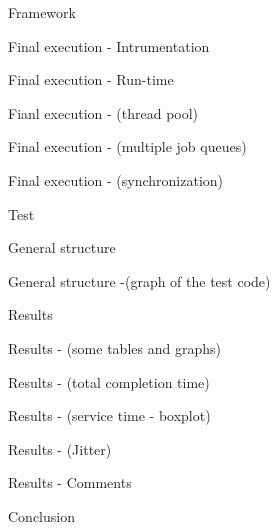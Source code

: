 \documentclass[xcolor=dvipsnames]{beamer}
\begin{document}
\begin{section}{Framework}
\begin{frame}{\hskip 0.3cm Final execution - Intrumentation}
\end{frame}

\begin{frame}{\hskip 0.3cm Final execution - Run-time}
\end{frame}

\begin{frame}{\hskip 0.3cm Fianl execution - (thread pool)}
\end{frame}

\begin{frame}{\hskip 0.3cm Final execution - (multiple job queues)}
\end{frame}

\begin{frame}{\hskip 0.3cm Final execution - (synchronization)}
\end{frame}

\end{section}
\begin{section}{Test}

\begin{frame}{\hskip 0.3cm General structure}
\end{frame}

\begin{frame}{\hskip 0.3cm General structure -(graph of the test code)}
\end{frame}

\begin{frame}{\hskip 0.3cm Results}
\end{frame}

\begin{frame}{\hskip 0.3cm Results - (some tables and graphs)}
\end{frame}

\begin{frame}{\hskip 0.3cm Results - (total completion time)}
\end{frame}

\begin{frame}{\hskip 0.3cm Results - (service time - boxplot)}
\end{frame}

\begin{frame}{\hskip 0.3cm Results - (Jitter)}
\end{frame}

\begin{frame}{\hskip 0.3cm Results - Comments}
\end{frame}

\end{section}
\begin{section}{Conclusion}

\begin{frame}{\hskip 0.3cm }
\end{frame}

\end{section}
\end{document}
